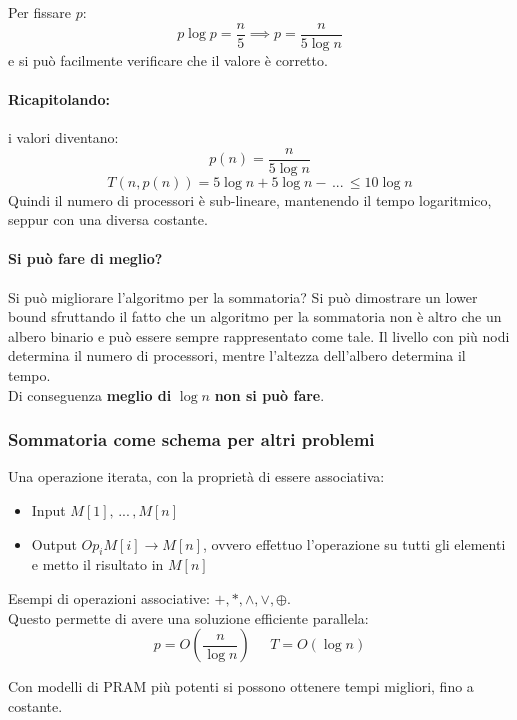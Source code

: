 \documentclass[11pt]{article}
\begin{document}
	Per fissare $p$: 
	$$ p \log p = \frac{n}{5} \implies p = \frac{n}{5 \log n} $$
	e si può facilmente verificare che il valore è corretto.
	
	\paragraph{Ricapitolando:} i valori diventano:
	$$ p(n) = \frac{n}{5 \log n} $$
	$$ T(n, p(n)) = 5 \log n + 5 \log n - \, ... \, \leq 10 \log n $$
	Quindi il numero di processori è sub-lineare, mantenendo il tempo logaritmico, seppur con una diversa costante.
	
	\vfill 
	
	\paragraph{Si può fare di meglio?} Si può migliorare l'algoritmo per la sommatoria? Si può dimostrare un lower bound sfruttando il fatto che un algoritmo per la sommatoria non è altro che un albero binario e può essere sempre rappresentato come tale. Il livello con più nodi determina il numero di processori, mentre l'altezza dell'albero determina il tempo.\\
	
	Di conseguenza \textbf{meglio di} $\log n$ \textbf{non si può fare}.\\
	
	
	\subsubsection{Sommatoria come schema per altri problemi}
	
	Una operazione iterata, con la proprietà di essere associativa:
	\begin{itemize}
		\item Input $M[1], \, ... \, , M[n]$
		\item Output $Op_i M[i] \rightarrow M[n]$, ovvero effettuo l'operazione su tutti gli elementi e metto il risultato in $M[n]$
	\end{itemize}
	
	Esempi di operazioni associative: $+,\ast,\wedge, \vee,\oplus$.\\
	
	Questo permette di avere una soluzione efficiente parallela: 
	$$ p = O \left(\frac{n}{\log n}\right) \;\;\;\;\; T = O(\log n) $$
	
	Con modelli di PRAM più potenti si possono ottenere tempi migliori, fino a costante.\\
	
\end{document}
